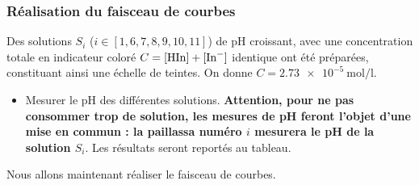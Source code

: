 \documentclass{tp}
\begin{document}

\subsubsection{Réalisation du faisceau de courbes}%
\label{ssub:realisation_du_faisceau_de_courbes}
Des solutions $S_i$ ($i \in [1, 6, 7, 8, 9, 10, 11]$) de pH croissant, avec une concentration totale en indicateur coloré $C=[\ce{HIn}] + [\ce{In-}]$ identique ont été préparées, constituant ainsi une échelle de teintes. On donne $C=\SI{2.73e-5}{\mol\per\litre}$.

\begin{itemize}
  \item Mesurer le pH des différentes solutions. \textbf{Attention, pour ne pas consommer trop de solution, les mesures de pH feront l'objet d'une mise en commun : la paillassa numéro $i$ mesurera le pH de la solution $S_i$}. Les résultats seront reportés au tableau. 
\end{itemize}

Nous allons maintenant réaliser le faisceau de courbes.
\end{document}
